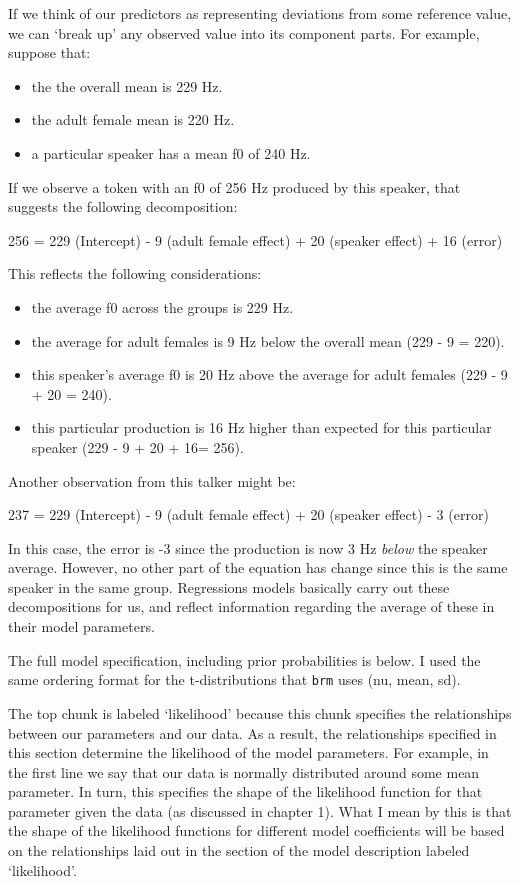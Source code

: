 \documentclass[
]{book}
\providecommand{\tightlist}{%
  \setlength{\itemsep}{0pt}\setlength{\parskip}{0pt}}
\begin{document}
If we think of our predictors as representing deviations from some reference value, we can `break up' any observed value into its component parts. For example, suppose that:

\begin{itemize}
\tightlist
\item
  the the overall mean is 229 Hz.
\item
  the adult female mean is 220 Hz.
\item
  a particular speaker has a mean f0 of 240 Hz.
\end{itemize}

If we observe a token with an f0 of 256 Hz produced by this speaker, that suggests the following decomposition:

256 = 229 (Intercept) - 9 (adult female effect) + 20 (speaker effect) + 16 (error)

This reflects the following considerations:

\begin{itemize}
\tightlist
\item
  the average f0 across the groups is 229 Hz.
\item
  the average for adult females is 9 Hz below the overall mean (229 - 9 = 220).
\item
  this speaker's average f0 is 20 Hz above the average for adult females (229 - 9 + 20 = 240).
\item
  this particular production is 16 Hz higher than expected for this particular speaker (229 - 9 + 20 + 16= 256).
\end{itemize}

Another observation from this talker might be:

237 = 229 (Intercept) - 9 (adult female effect) + 20 (speaker effect) - 3 (error)

In this case, the error is -3 since the production is now 3 Hz \emph{below} the speaker average. However, no other part of the equation has change since this is the same speaker in the same group. Regressions models basically carry out these decompositions for us, and reflect information regarding the average of these in their model parameters.

The full model specification, including prior probabilities is below. I used the same ordering format for the t-distributions that \texttt{brm} uses (nu, mean, sd).

The top chunk is labeled `likelihood' because this chunk specifies the relationships between our parameters and our data. As a result, the relationships specified in this section determine the likelihood of the model parameters. For example, in the first line we say that our data is normally distributed around some mean parameter. In turn, this specifies the shape of the likelihood function for that parameter given the data (as discussed in chapter 1). What I mean by this is that the shape of the likelihood functions for different model coefficients will be based on the relationships laid out in the section of the model description labeled `likelihood'.
\end{document}
